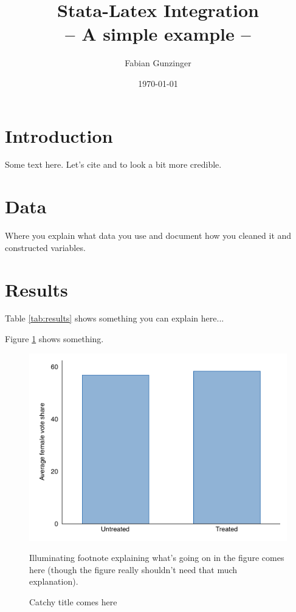 \documentclass[11pt]{article}
\title{\textbf{Stata-Latex Integration} \\ -- A simple example -- }
\author{Fabian Gunzinger}
\date{\today}
\newcommand{\note}[1]{\vspace{10mm}\caption*{\small #1}}
\begin{document}
\maketitle


\section{Introduction}

Some text here. Let's cite \citet{acemoglu2001colonial} and \citet{kahneman1979prospect} to look a bit more credible.



\section{Data}

Where you explain what data you use and document how you cleaned it and constructed variables.



\section{Results}

Table \ref{tab:results} shows something you can explain here...

Figure \ref{fig:bars} shows something. 





\begin{figure}[h]\centering
\caption{Catchy title comes here
\label{fig:bars}}
\includegraphics[width=.49\textwidth]{../analysis/output/fig-bars.pdf}
\captionsetup{belowskip=-30pt, font=normalfont, width=.5\textwidth}
\note{\footnotesize Illuminating footnote explaining what's going on in the figure comes here (though the figure really shouldn't need that much explanation).}
\end{figure}
\end{document}
